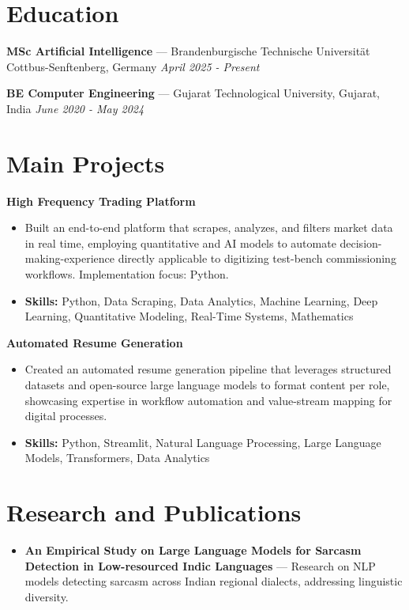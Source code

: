 \documentclass[a4paper,10pt]{article}
\begin{document}
\section*{Education}
\textbf{MSc Artificial Intelligence} — Brandenburgische Technische Universität Cottbus-Senftenberg, Germany \hfill \textit{April 2025 - Present}\par
\vspace{1.5pt}
\textbf{BE Computer Engineering} — Gujarat Technological University, Gujarat, India \hfill \textit{June 2020 - May 2024}\par

\section*{Main Projects}
\textbf{High Frequency Trading Platform}\par
\vspace{1pt}
\begin{itemize}
  \item Built an end-to-end platform that scrapes, analyzes, and filters market data in real time, employing quantitative and AI models to automate decision-making-experience directly applicable to digitizing test-bench commissioning workflows. Implementation focus: Python.
  \item \textbf{Skills:} Python, Data Scraping, Data Analytics, Machine Learning, Deep Learning, Quantitative Modeling, Real-Time Systems, Mathematics
\end{itemize}
\vspace{3pt}
\textbf{Automated Resume Generation}\par
\vspace{1pt}
\begin{itemize}
  \item Created an automated resume generation pipeline that leverages structured datasets and open-source large language models to format content per role, showcasing expertise in workflow automation and value-stream mapping for digital processes.
  \item \textbf{Skills:} Python, Streamlit, Natural Language Processing, Large Language Models, Transformers, Data Analytics
\end{itemize}

\section*{Research and Publications}
\begin{itemize}
\item \textbf{An Empirical Study on Large Language Models for Sarcasm Detection in Low-resourced Indic Languages} — Research on NLP models detecting sarcasm across Indian regional dialects, addressing linguistic diversity.
\end{itemize}
\end{document}
